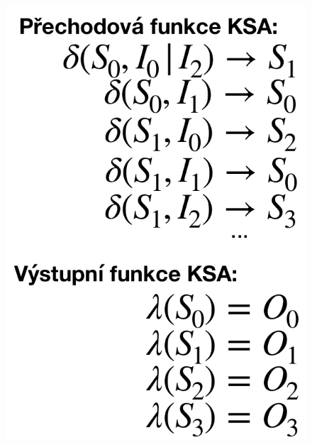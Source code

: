 \begin{figure}[h!]
    \centering
    \begin{minipage}[b]{0.4\textwidth}
        \includegraphics[width=\textwidth]{img/MooreRovnice.png}
    \end{minipage}
    \hfill
    \begin{minipage}[b]{0.4\textwidth}

\end{minipage}
\end{figure}
